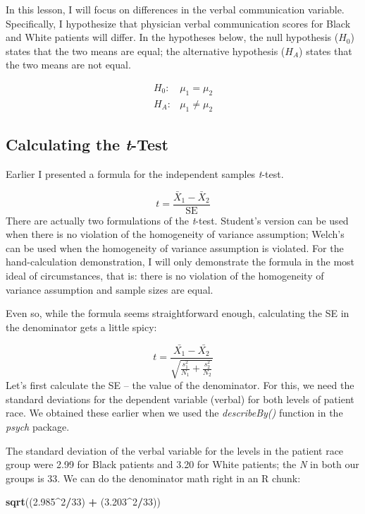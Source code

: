 \documentclass[
  11pt,
]{book}
\newenvironment{Shaded}{\begin{snugshade}}{\end{snugshade}}
\newcommand{\DecValTok}[1]{\textcolor[rgb]{0.06,0.06,0.06}{#1}}
\newcommand{\FloatTok}[1]{\textcolor[rgb]{0.06,0.06,0.06}{#1}}
\newcommand{\FunctionTok}[1]{\textcolor[rgb]{0.27,0.27,0.27}{\textbf{#1}}}
\newcommand{\NormalTok}[1]{#1}
\newcommand{\SpecialCharTok}[1]{\textcolor[rgb]{0.43,0.43,0.43}{\textbf{#1}}}
\begin{document}
In this lesson, I will focus on differences in the verbal communication variable. Specifically, I hypothesize that physician verbal communication scores for Black and White patients will differ. In the hypotheses below, the null hypothesis (\(H_0\)) states that the two means are equal; the alternative hypothesis (\(H_A\)) states that the two means are not equal.

\[
\begin{array}{ll}
H_0: & \mu_1 = \mu_2  \\
H_A: & \mu_1 \neq \mu_2
\end{array}
\]

\hypertarget{calculating-the-t-test-1}{%
\subsection{\texorpdfstring{Calculating the \emph{t}-Test}{Calculating the t-Test}}\label{calculating-the-t-test-1}}

Earlier I presented a formula for the independent samples \emph{t}-test.

\[t = \frac{\bar{X}_1 - \bar{X}_2}{\mbox{SE}}\] There are actually two formulations of the \emph{t}-test. Student's version can be used when there is no violation of the homogeneity of variance assumption; Welch's can be used when the homogeneity of variance assumption is violated. For the hand-calculation demonstration, I will only demonstrate the formula in the most ideal of circumstances, that is: there is no violation of the homogeneity of variance assumption and sample sizes are equal.

Even so, while the formula seems straightforward enough, calculating the SE in the denominator gets a little spicy:

\[t = \frac{\bar{X_{1}} -\bar{X_{2}}}{\sqrt{\frac{s_{1}^{2}}{N_{1}}+\frac{s_{2}^{2}}{N_{2}}}}\] Let's first calculate the SE -- the value of the denominator. For this, we need the standard deviations for the dependent variable (verbal) for both levels of patient race. We obtained these earlier when we used the \emph{describeBy()} function in the \emph{psych} package.

The standard deviation of the verbal variable for the levels in the patient race group were 2.99 for Black patients and 3.20 for White patients; the \emph{N} in both our groups is 33. We can do the denominator math right in an R chunk:

\begin{Shaded}
\begin{Highlighting}[]
\FunctionTok{sqrt}\NormalTok{((}\FloatTok{2.985}\SpecialCharTok{\^{}}\DecValTok{2}\SpecialCharTok{/}\DecValTok{33}\NormalTok{) }\SpecialCharTok{+}\NormalTok{ (}\FloatTok{3.203}\SpecialCharTok{\^{}}\DecValTok{2}\SpecialCharTok{/}\DecValTok{33}\NormalTok{))}
\end{Highlighting}
\end{Shaded}
\end{document}
